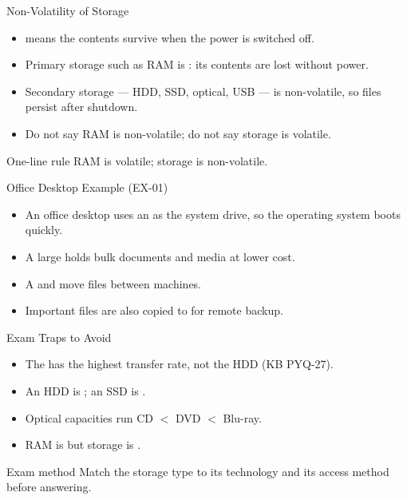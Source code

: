 \documentclass[aspectratio=169]{beamer}
\begin{document}
\begin{frame}{Non-Volatility of Storage}
  \begin{itemize}
    \item {} means the contents survive when the power is
      switched off.
    \item Primary storage such as RAM is : its contents are
      lost without power.
    \item Secondary storage --- HDD, SSD, optical, USB --- is non-volatile,
      so files persist after shutdown.
    \item Do not say RAM is non-volatile; do not say storage is volatile.
  \end{itemize}
  \begin{alertblock}{One-line rule}
    RAM is volatile; storage is non-volatile.
  \end{alertblock}
\end{frame}

\begin{frame}{Office Desktop Example (EX-01)}
  \begin{itemize}
    \item An office desktop uses an  as the system drive, so the
      operating system boots quickly.
    \item A large  holds bulk documents and media at lower cost.
    \item A  and  move files between
      machines.
    \item Important files are also copied to  for remote
      backup.
  \end{itemize}
\end{frame}

\begin{frame}{Exam Traps to Avoid}
  \begin{itemize}
    \item The  has the highest transfer rate, not the HDD
      (KB PYQ-27).
    \item An HDD is ; an SSD is .
    \item Optical capacities run CD $<$ DVD $<$ Blu-ray.
    \item RAM is  but storage is .
  \end{itemize}
  \begin{alertblock}{Exam method}
    Match the storage type to its technology and its access method before
    answering.
  \end{alertblock}
\end{frame}
\end{document}

